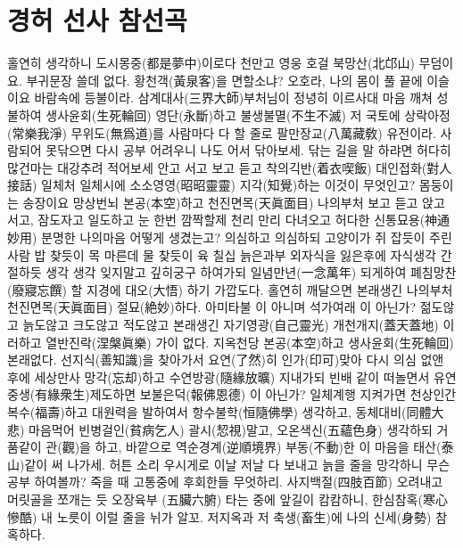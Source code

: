 \documentclass[12pt, a4paper, oneside]{book}
\let\stdsection\section
\renewcommand\section{\newpage\stdsection}
\begin{document}
%										
	\section{ 경허 선사 참선곡 }



홀연히 생각하니 도시몽중(都是夢中)이로다
천만고 영웅 호걸 북망산(北邙山) 무덤이요.
부귀문장 쓸데 없다. 황천객(黃泉客)을 면할소냐?
오호라, 나의 몸이 풀 끝에 이슬이요 바람속에 등불이라.
삼계대사(三界大師)부처님이 정녕히 이르사대
마음 깨쳐 성불하여 생사윤회(生死輪回) 영단(永斷)하고
불생불멸(不生不滅) 저 국토에 상락아정(常樂我淨) 무위도(無爲道)를
사람마다 다 할 줄로 팔만장교(八萬藏敎) 유전이라.
사람되어 못닦으면 다시 공부 어려우니 나도 어서
닦아보세. 닦는 길을 말 하랴면 허다히 많건마는
대강추려 적어보세 안고 서고 보고 듣고 착의긱반(着衣喫飯)
대인접화(對人接話) 일체처 일체시에 소소영영(昭昭靈靈)
지각(知覺)하는 이것이 무엇인고? 몸둥이는 송장이요
망상번뇌 본공(本空)하고 천진면목(天眞面目) 나의부처
보고 듣고 앉고 서고, 잠도자고 일도하고
눈 한번 깜짝할제 천리 만리 다녀오고 허다한
신통묘용(神通妙用) 분명한 나의마음 어떻게 생겼는고?
의심하고 의심하되 고양이가 쥐 잡듯이 주린사람
밥 찾듯이 목 마른데 물 찾듯이 육 칠십 늙은과부
외자식을 잃은후에 자식생각 간절하듯 생각 생각
잊지말고 깊히궁구 하여가되 일념만년(一念萬年)
되게하여 폐침망찬(廢寢忘饌) 할 지경에 대오(大悟)
하기 가깝도다. 홀연히 깨달으면 본래생긴 나의부처
천진면목(天眞面目) 절묘(絶妙)하다.
아미타불 이 아니며 석가여래 이 아닌가?
젊도않고 늙도않고 크도않고 적도않고 본래생긴
자기영광(自己靈光) 개천개지(蓋天蓋地)
이러하고 열반진락(涅槃眞樂) 가이 없다.
지옥천당 본공(本空)하고 생사윤회(生死輪回) 본래없다.
선지식(善知識)을 찾아가서 요연(了然)히 인가(印可)맞아
다시 의심 없앤 후에 세상만사 망각(忘却)하고
수연방광(隨緣放曠) 지내가되 빈배 같이 떠놀면서
유연중생(有緣衆生)제도하면 보불은덕(報佛恩德) 이 아닌가?
일체계행 지켜가면 천상인간 복수(福壽)하고 대원력을
발하여서 항수불학(恒隨佛學) 생각하고, 동체대비(同體大悲)
마음먹어 빈병걸인(貧病乞人) 괄시(恝視)말고,
오온색신(五蘊色身) 생각하되 거품같이 관(觀)을 하고,
바깥으로 역순경계(逆順境界) 부동(不動)한 이 마음을
태산(泰山)같이 써 나가세.
허튼 소리 우시게로 이날 저날 다 보내고 늙을 줄을 망각하니
무슨 공부 하여볼까? 죽을 때 고통중에 후회한들 무엇하리.
사지백절(四肢百節) 오려내고 머릿골을 쪼개는 듯
오장육부 (五臟六腑) 타는 중에 앞길이 캄캄하니,
한심참혹(寒心慘酷) 내 노릇이 이럴 줄을 뉘가 알꼬.
저지옥과 저 축생(畜生)에 나의 신세(身勢) 참혹하다.
\end{document}
